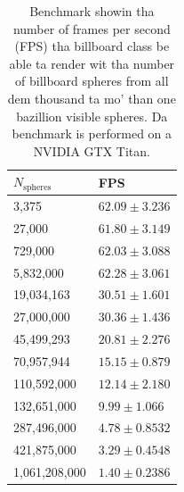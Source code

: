 \begin{table}[htb]
\begin{center}
    \begin{tabular}{|l|l|}
    \hline
    $N_\text{spheres}$ & FPS\\ \hline
    3,375      & $62.09 \pm 3.236$\\
    \hline
    27,000     & $61.80 \pm 3.149$\\
    \hline
    729,000    & $62.03 \pm 3.088$\\
    \hline
    5,832,000   & $62.28 \pm 3.061$\\
    \hline
    19,034,163  & $30.51 \pm 1.601$\\
    \hline
    27,000,000  & $30.36 \pm 1.436$\\
    \hline
    45,499,293  & $20.81 \pm 2.276$\\
    \hline
    70,957,944  & $15.15 \pm 0.879$\\
    \hline
    110,592,000 & $12.14 \pm 2.180$\\
    \hline
    132,651,000 & $9.99 \pm 1.066$\\
    \hline
    287,496,000 & $4.78 \pm 0.8532$\\
    \hline
    421,875,000 & $3.29 \pm 0.4548$\\
    \hline
    1,061,208,000 & $1.40 \pm 0.2386$\\
    \hline
    \end{tabular}
    \caption{Benchmark showin tha number of frames per second (FPS) tha billboard class be able ta render wit tha number of billboard spheres from all dem thousand ta mo' than one bazillion visible spheres. Da benchmark is performed on a NVIDIA GTX Titan.}
    \label{tab:vis_fps_scaling}
    \end{center}
\end{table}

